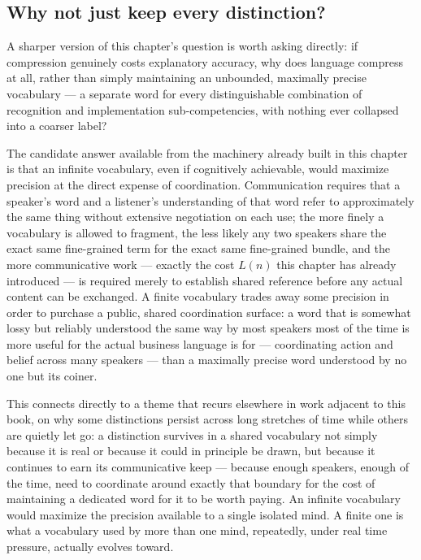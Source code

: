 \subsection*{Why not just keep every distinction?}

A sharper version of this chapter's question is worth asking directly: if compression genuinely costs explanatory accuracy, why does language compress at all, rather than simply maintaining an unbounded, maximally precise vocabulary --- a separate word for every distinguishable combination of recognition and implementation sub-competencies, with nothing ever collapsed into a coarser label?

The candidate answer available from the machinery already built in this chapter is that an infinite vocabulary, even if cognitively achievable, would maximize precision at the direct expense of coordination. Communication requires that a speaker's word and a listener's understanding of that word refer to approximately the same thing without extensive negotiation on each use; the more finely a vocabulary is allowed to fragment, the less likely any two speakers share the exact same fine-grained term for the exact same fine-grained bundle, and the more communicative work --- exactly the cost $L(n)$ this chapter has already introduced --- is required merely to establish shared reference before any actual content can be exchanged. A finite vocabulary trades away some precision in order to purchase a public, shared coordination surface: a word that is somewhat lossy but reliably understood the same way by most speakers most of the time is more useful for the actual business language is for --- coordinating action and belief across many speakers --- than a maximally precise word understood by no one but its coiner.

This connects directly to a theme that recurs elsewhere in work adjacent to this book, on why some distinctions persist across long stretches of time while others are quietly let go: a distinction survives in a shared vocabulary not simply because it is real or because it could in principle be drawn, but because it continues to earn its communicative keep --- because enough speakers, enough of the time, need to coordinate around exactly that boundary for the cost of maintaining a dedicated word for it to be worth paying. An infinite vocabulary would maximize the precision available to a single isolated mind. A finite one is what a vocabulary used by more than one mind, repeatedly, under real time pressure, actually evolves toward.

